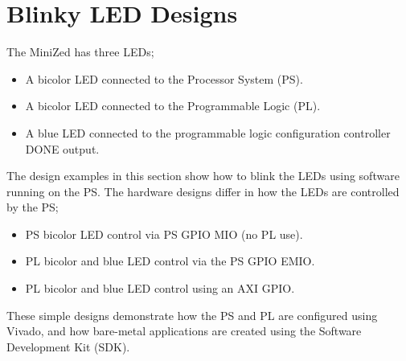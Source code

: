 \section{Blinky LED Designs}

The MiniZed has three LEDs;
%
\begin{itemize}
\item A bicolor LED connected to the Processor System (PS).
\item A bicolor LED connected to the Programmable Logic (PL).
\item A blue LED connected to the programmable logic configuration controller
DONE output.
\end{itemize}
%
The design examples in this section show how to blink the LEDs using
software running on the PS. The hardware designs differ in how the
LEDs are controlled by the PS;
%
\begin{itemize}
\item PS bicolor LED control via PS GPIO MIO (no PL use).
\item PL bicolor and blue LED control via the PS GPIO EMIO.
\item PL bicolor and blue LED control using an AXI GPIO.
\end{itemize}
%
These simple designs demonstrate how the PS and PL are configured using
Vivado, and how bare-metal applications are created using the Software
Development Kit (SDK).

